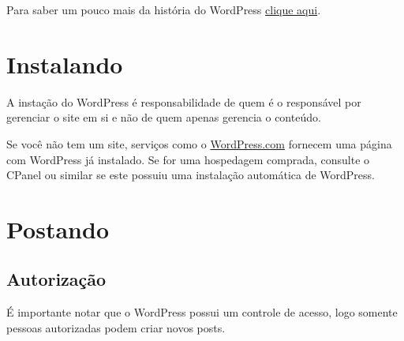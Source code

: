 \documentclass[12pt,onecolumn]{article}
\begin{document}
	Para saber um pouco mais da história do WordPress  \href{http://wordpress.org/about/}{clique aqui}.
          
\section{Instalando}
	A instação do WordPress é responsabilidade de quem é o responsável por gerenciar o site em si 
	e não de quem apenas gerencia o conteúdo.

	Se você não tem um site, serviços como o \href{https://wordpress.com/}{WordPress.com} fornecem
	uma página com WordPress já instalado. Se for uma hospedagem comprada, consulte o CPanel ou similar
	se este possuiu uma instalação automática de WordPress.

\clearpage
\section{Postando}
	\subsection{Autorização}
		É importante notar que o WordPress possui um controle de acesso, logo 
		somente pessoas autorizadas podem criar novos posts.
		
\end{document}
